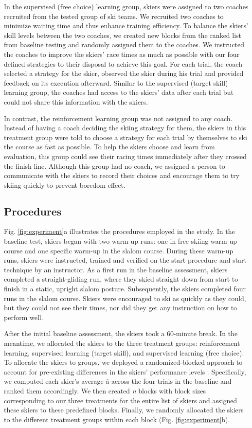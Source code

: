 \documentclass[pdflatex,sn-mathphys-num]{sn-jnl}%
\theoremstyle{thmstyleone}%
\theoremstyle{thmstyletwo}%
\theoremstyle{thmstylethree}%
\begin{document}
In the supervised (free choice) learning group, skiers were assigned to two coaches recruited from the tested group of ski teams. We recruited two coaches to minimize waiting time and thus enhance training efficiency. To balance the skiers' skill levels between the two coaches, we created new blocks from the ranked list from baseline testing and randomly assigned them to the coaches. We instructed the coaches to improve the skiers' race times as much as possible with our four defined strategies to their disposal to achieve this goal. For each trial, the coach selected a strategy for the skier, observed the skier during his trial and provided feedback on its execution afterward. Similar to the supervised (target skill) learning group, the coaches had access to the skiers' data after each trial but could not share this information with the skiers.

In contrast, the reinforcement learning group was not assigned to any coach. Instead of having a coach deciding the skiing strategy for them, the skiers in this treatment group were told to choose a strategy for each trial by themselves to ski the course as fast as possible. To help the skiers choose and learn from evaluation, this group could see their racing times immediately after they crossed the finish line. Although this group had no coach, we assigned a person to communicate with the skiers to record their choices and encourage them to try skiing quickly to prevent boredom effect.

\subsection{Procedures}\label{subsec4}
Fig. \ref{fig:experiment}a illustrates the procedures employed in the study. 
In the baseline test, skiers began with two warm-up runs: one in free skiing warm-up course and one specific warm-up in the slalom course. During these warm-up runs, skiers were instructed, trained and verified on the start procedure and start technique by an instructor. As a first run in the baseline assessment, skiers completed a straight-gliding run, where they skied straight down from start to finish in a static, upright slalom posture. Subsequently, the skiers completed four runs in the slalom course. Skiers were encouraged to ski as quickly as they could, but they could not see their times, nor did they get any instruction on how to perform well. 

After the initial baseline assessment, the skiers took a 60-minute break. In the meantime, we allocated the skiers to the three treatment groups: reinforcement learning, supervised learning (target skill), and supervised learning (free choice). To allocate the skiers to groups, we deployed a randomized-blocked approach to account for pre-existing differences in the skiers’ performance levels \cite{maxwell_designing_2017}. Specifically, we computed each skier’s average å across the four trials in the baseline and ranked them accordingly. We then created \textit{n} blocks with block sizes corresponding to our three treatments for the entire list of skiers and assigned these skiers to these predefined blocks. Finally, we randomly allocated the skiers to the different treatment groups within each block (Fig. \ref{fig:experiment}b).
\end{document}
